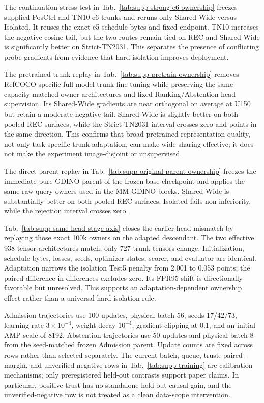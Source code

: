 The continuation stress test in
Tab.~\ref{tab:supp-strong-e6-ownership} freezes supplied PosCtrl and TN10 e6
trunks and reruns only Shared-Wide versus Isolated.  It reuses the exact e5
schedule bytes and fixed endpoint.  TN10 increases the negative cosine tail,
but the two routes remain tied on REC and Shared-Wide is significantly better
on Strict-TN2031.  This separates the presence of conflicting probe gradients
from evidence that hard isolation improves deployment.

The pretrained-trunk replay in Tab.~\ref{tab:supp-pretrain-ownership} removes
RefCOCO-specific full-model trunk fine-tuning while preserving the same
capacity-matched owner architectures and fixed Ranking/Abstention head
supervision.  Its Shared-Wide gradients are near orthogonal on average at U150 but retain a
moderate negative tail.  Shared-Wide is slightly better on both pooled REC
surfaces, while the Strict-TN2031 interval crosses zero and points in the same
direction.  This confirms that broad pretrained representation quality, not
only task-specific trunk adaptation, can make wide sharing effective; it does
not make the experiment image-disjoint or unsupervised.

The direct-parent replay in Tab.~\ref{tab:supp-original-parent-ownership}
freezes the immediate pure-GDINO parent of the frozen-base checkpoint and
applies the same raw-query owners used in the MM-GDINO blocks.  Shared-Wide is
substantially better on both pooled REC surfaces; Isolated fails
non-inferiority, while the rejection interval crosses zero.

Tab.~\ref{tab:supp-same-head-stage-axis} closes the earlier head mismatch by
replaying those exact 100k owners on the adapted descendant.  The two effective
938-tensor architectures match; only 727 trunk tensors change.  Initialization,
schedule bytes, losses, seeds, optimizer states, scorer, and evaluator are
identical.  Adaptation narrows the isolation Test5 penalty from 2.001 to 0.053 points;
the paired difference-in-differences excludes zero.  Its FPR95 shift is
directionally favorable but unresolved.  This supports an adaptation-dependent
ownership effect rather than a universal hard-isolation rule.



Admission trajectories use 100 updates, physical batch 56, seeds 17/42/73,
learning rate $3\times10^{-4}$, weight decay $10^{-4}$, gradient clipping at
0.1, and an initial AMP scale of 8192.  Abstention trajectories use 50 updates
and physical batch 8 from the seed-matched frozen Admission parent.  Update
counts are fixed across rows rather than selected separately.  The
current-batch, queue, trust, paired-margin, and unverified-negative rows in
Tab.~\ref{tab:supp-training} are calibration mechanisms; only preregistered
held-out contrasts support paper claims.  In particular, positive trust has no
standalone held-out causal gain, and the unverified-negative row is not treated
as a clean data-scope intervention.
